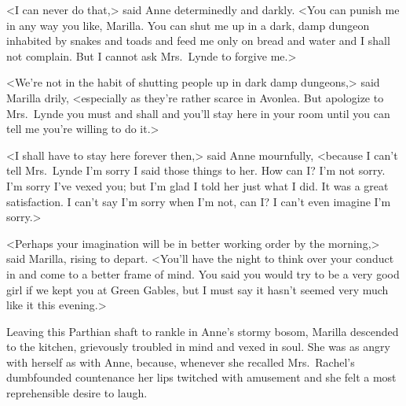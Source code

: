 <I can never do that,> said Anne determinedly and darkly. <You can punish me in any way you like, Marilla. You can shut me up in a dark, damp dungeon inhabited by snakes and toads and feed me only on bread and water and I shall not complain. But I cannot ask Mrs.~Lynde to forgive me.>

<We're not in the habit of shutting people up in dark damp dungeons,> said Marilla drily, <especially as they're rather scarce in Avonlea. But apologize to Mrs.~Lynde you must and shall and you'll stay here in your room until you can tell me you're willing to do it.>

<I shall have to stay here forever then,> said Anne mournfully, <because I can't tell Mrs.~Lynde I'm sorry I said those things to her. How can I\@? I'm not sorry. I'm sorry I've vexed you; but I'm glad I told her just what I did. It was a great satisfaction. I can't say I'm sorry when I'm not, can I\@? I can't even imagine I'm sorry.>

<Perhaps your imagination will be in better working order by the morning,> said Marilla, rising to depart. <You'll have the night to think over your conduct in and come to a better frame of mind. You said you would try to be a very good girl if we kept you at Green Gables, but I must say it hasn't seemed very much like it this evening.>

Leaving this Parthian shaft to rankle in Anne's stormy bosom, Marilla descended to the kitchen, grievously troubled in mind and vexed in soul. She was as angry with herself as with Anne, because, whenever she recalled Mrs.~Rachel's dumbfounded countenance her lips twitched with amusement and she felt a most reprehensible desire to laugh.